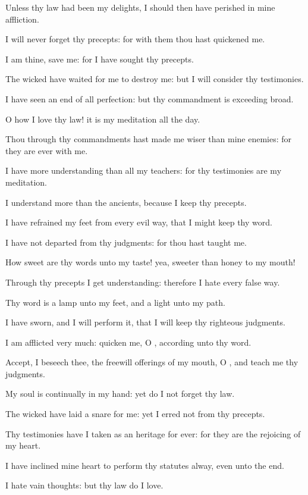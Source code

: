 \Verse Unless thy law had been my delights, I should then have perished in mine affliction.

\Verse I will never forget thy precepts: for with them thou hast quickened me.

\Verse I am thine, save me: for I have sought thy precepts.

\Verse The wicked have waited for me to destroy me: but I will consider thy testimonies.

\Verse I have seen an end of all perfection: but thy commandment is exceeding broad.

\Verse O how I love thy law! it is my meditation all the day.

\Verse Thou through thy commandments hast made me wiser than mine enemies: for they are ever with me.

\Verse I have more understanding than all my teachers: for thy testimonies are my meditation.

\Verse I understand more than the ancients, because I keep thy precepts.

\Verse I have refrained my feet from every evil way, that I might keep thy word.

\Verse I have not departed from thy judgments: for thou hast taught me.

\Verse How sweet are thy words unto my taste! yea, sweeter than honey to my mouth!

\Verse Through thy precepts I get understanding: therefore I hate every false way.

\Verse Thy word is a lamp unto my feet, and a light unto my path.

\Verse I have sworn, and I will perform it, that I will keep thy righteous judgments.

\Verse I am afflicted very much: quicken me, O \LORD, according unto thy word.

\Verse Accept, I beseech thee, the freewill offerings of my mouth, O \LORD, and teach me thy judgments.

\Verse My soul is continually in my hand: yet do I not forget thy law.

\Verse The wicked have laid a snare for me: yet I erred not from thy precepts.

\Verse Thy testimonies have I taken as an heritage for ever: for they are the rejoicing of my heart.

\Verse I have inclined mine heart to perform thy statutes alway, even unto the end.

\Verse I hate vain thoughts: but thy law do I love.

